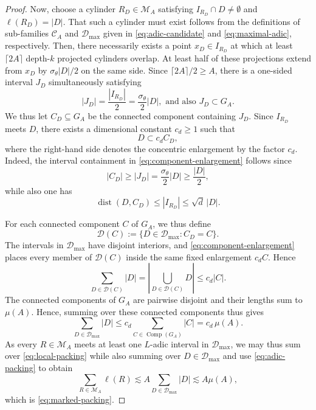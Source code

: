 \documentclass[12pt]{amsart}
\numberwithin{equation}{section}
\begin{document}
\begin{proof}
Now, choose a cylinder $R_D \in \mathscr{M}_A$ satisfying $I_{R_D} \cap D \neq \emptyset$ and $\ell (R_D) = |D|$. That such a cylinder must exist follows from the definitions of sub-families $\mathcal{C}_A$ and $\mathcal{D}_{\max}$ given in \eqref{eq:adic-candidate} and \eqref{eq:maximal-adic}, respectively. Then, there necessarily exists a point $x_D\in I_{R_D}$ at which at least $\lceil2A\rceil$ depth-$k$ projected cylinders overlap.  At least half of these projections extend from $x_D$ by $\sigma_\theta|D|/2$ on the same side.  Since
$\lceil2A\rceil/2\geq A$, there is a one-sided interval $J_D$ simultaneously satisfying
\begin{equation}\label{eq:charge-interval}
 |J_D|= \frac{|I_{R_D}|}{2}=\frac{\sigma_\theta}{2} \lvert D \rvert, \textrm{ and also }
 J_D\subset G_A.
\end{equation}
We thus let $C_D \subseteq G_A$ be the connected component containing $J_D$.  Since $I_{R_D}$ meets $D$, there exists a dimensional constant $c_d \geq 1$ such that
\begin{equation}\label{eq:component-enlargement}
 D\subset c_d C_D,
\end{equation}
where the right-hand side denotes the concentric enlargement by the factor $c_d$.  Indeed, the interval containment in \eqref{eq:component-enlargement} follows since
$$
 |C_D|\geq|J_D|=\frac{\sigma_\theta}{2}|D|\geq\frac{|D|}{2},
$$
while also one has
$$
\operatorname{dist}(D,C_D)\leq |I_{R_D}|\leq\sqrt d\,|D|.
$$


For each connected component $C$ of $G_A$, we thus define
$$
 \mathcal D(C):=\{D\in\mathcal D_{\max}:C_D=C\}.
$$
The intervals in $\mathcal D_{\max}$ have disjoint interiors, and
\eqref{eq:component-enlargement} places every member of $\mathcal D(C)$ inside
the same fixed enlargement $c_dC$.  Hence
$$
 \sum_{D\in\mathcal D(C)}|D|
 =\left|\bigcup_{D\in\mathcal D(C)}D\right|
 \leq c_d |C|.
$$
The connected components of $G_A$ are pairwise disjoint and their lengths sum to $\mu(A)$. Hence, summing over these connected components thus gives
\begin{equation}\label{eq:adic-packing}
 \sum_{D\in\mathcal D_{\max}}|D|
 \leq c_d 
 \sum_{C\in\operatorname{Comp}(G_A)}|C|
 =c_d \, \mu(A).
\end{equation}
As every $R\in\mathscr M_A$ meets at least one $L$-adic interval in $\mathcal D_{\max}$, we may thus sum over \eqref{eq:local-packing} while also summing over $D\in\mathcal D_{\max}$ and use \eqref{eq:adic-packing} to obtain
$$
 \sum_{R\in\mathscr M_A}\ell(R)
 \lesssim A\sum_{D\in\mathcal D_{\max}}|D|
 \lesssim A\mu(A),
$$
which is \eqref{eq:marked-packing}.


\end{proof}
\end{document}
